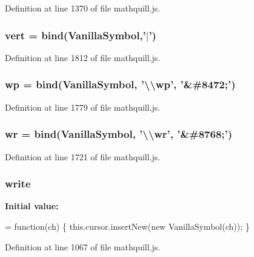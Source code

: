 Definition at line 1370 of file mathquill.\-js.

\subsubsection[{vert}]{ vert = {\bf bind}({\bf Vanilla\-Symbol},'$|$')}\label{mathquill_8js_a98aa9c2e09c4bcf2b89d5099c8fb8168}


Definition at line 1812 of file mathquill.\-js.

\subsubsection[{wp}]{ wp = {\bf bind}({\bf Vanilla\-Symbol}, '\textbackslash{}\textbackslash{}wp', '\&\#8472;')}\label{mathquill_8js_a2547b9a18e8d7be46bdb20ab64335ebe}


Definition at line 1779 of file mathquill.\-js.

\subsubsection[{wr}]{ wr = {\bf bind}({\bf Vanilla\-Symbol}, '\textbackslash{}\textbackslash{}wr', '\&\#8768;')}\label{mathquill_8js_a243fc8a00771cc221066d99637355545}


Definition at line 1721 of file mathquill.\-js.

\subsubsection[{write}]{\setlength{\rightskip}{0pt plus 5cm}{\bf \-\_\-} write}\label{mathquill_8js_ab3ea9a93d48a6bef28498b6f47c19782}
{\bfseries Initial value\-:}
\begin{DoxyCode}
= \textcolor{keyword}{function}(ch) \{
  this.cursor.insertNew(\textcolor{keyword}{new} VanillaSymbol(ch));
\}
\end{DoxyCode}


Definition at line 1067 of file mathquill.\-js.

